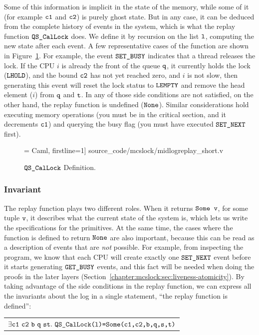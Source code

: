 Some of this information is implicit in the state of the memory, while some of it (for example ${\mathrm{\texttt{c1}}}$ and ${\mathrm{\texttt{c2}}}$) is purely ghost state. But in any case, it can be deduced from the complete history of events in the system, which is what the replay function ${\mathrm{\texttt{QS\_CalLock}}}$ does. We define it by recursion on the list ${\mathrm{\texttt{l}}}$, computing the new state after each event. A few representative cases of the function are shown in Figure~\ref{fig:chapter:mcslock:QS_CalLock}.  For example, the event
${\mathrm{\texttt{SET\_BUSY}}}$ indicates that a thread releases the lock. If the CPU $i$ is already the  front of the queue ${\mathrm{\texttt{q}}}$, it currently holds the lock (${\mathrm{\texttt{LHOLD}}}$), and the bound ${\mathrm{\texttt{c2}}}$ has not yet reached zero, and $i$ is not slow, then generating this event will reset the lock status to ${\mathrm{\texttt{LEMPTY}}}$ and remove the head element ($i$) from ${\mathrm{\texttt{q}}}$ and ${\mathrm{\texttt{t}}}$. In any of those side conditions are not satisfied, on the other hand, the replay function is undefined (${\mathrm{\texttt{None}}}$). Similar
considerations hold executing memory operations (you must be in the critical section, and it decrements ${\mathrm{\texttt{c1}}}$) and querying the busy flag (you must have executed ${\mathrm{\texttt{SET\_NEXT}}}$ first).

\begin{figure}
 = Caml, firstline=1] {source_code/mcslock/midlogreplay_short.v}
    \caption{${\mathrm{\texttt{QS\_CalLock}}}$ Definition.}
\label{fig:chapter:mcslock:QS_CalLock}
\end{figure}


\subsubsection{Invariant} 

The replay function plays two different roles. When it returns ${\mathrm{\texttt{Some}}}{\mathrm{\texttt{ v}}}$, for some tuple ${\mathrm{\texttt{v}}}$, it describes what the current state of the system is, which lets us write the specifications for the primitives. At the same time, the cases where the function is defined to return ${\mathrm{\texttt{None}}}$ are also important, because this can be read as a description of events that are \emph{not} possible. For example, from inspecting the program, we know that each CPU will create
exactly one ${\mathrm{\texttt{SET\_NEXT}}}$  event before it starts generating ${\mathrm{\texttt{GET\_BUSY}}}$ events, and this fact will be needed when doing the proofs in the later layers (Section~\ref{chapter:mcslock:sec:liveness-atomicity}). By taking advantage of  the side conditions in the replay function, we can express all the invariants about the log in a single statement, ``the replay function is defined'':\newline
\begin{tabular}{P{0.95\textwidth}}
    $\exists \codeinmath{c1}\ \codeinmath{c2}\ \codeinmath{b}\ \codeinmath{q}\ \codeinmath{s} \codeinmath{t}.\ \QSCalLock\codeinmath{(l)=Some(c1,c2,b,q,s,t)}$\\
\end{tabular}

